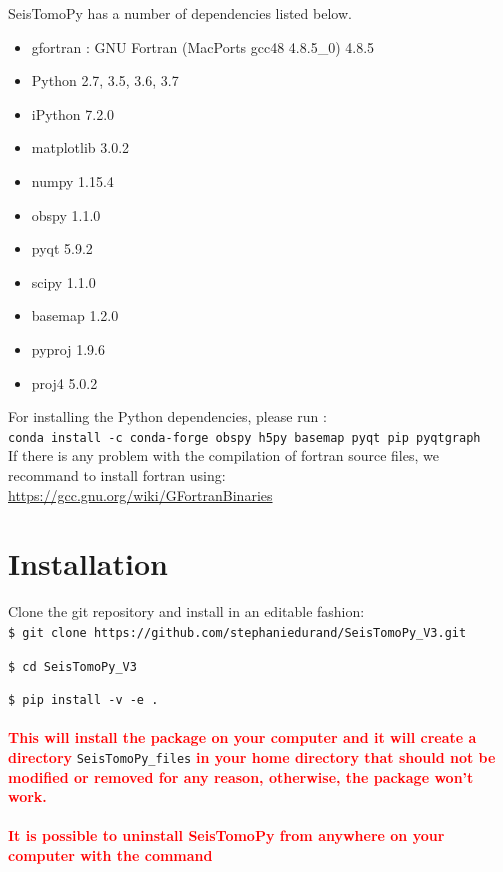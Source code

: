 \documentclass[12pt]{article}
\begin{document}
SeisTomoPy has a number of dependencies listed below.

\begin{itemize}
    \item gfortran : GNU Fortran (MacPorts gcc48 4.8.5\_0) 4.8.5
\item Python 2.7, 3.5, 3.6, 3.7
\item iPython 7.2.0
\item matplotlib 3.0.2
\item  numpy 1.15.4
\item obspy 1.1.0
\item pyqt 5.9.2
\item scipy 1.1.0
\item basemap 1.2.0
\item pyproj 1.9.6
\item proj4 5.0.2
\end{itemize}
For installing the Python dependencies, please run :\\
\verb?conda install -c conda-forge obspy h5py basemap pyqt pip pyqtgraph ?\\

\noindent If there is any problem with the compilation of fortran source files, we recommand to install fortran using:\\
\url{https://gcc.gnu.org/wiki/GFortranBinaries}

\section{Installation}

Clone the git repository and install in an editable fashion:\\

\verb?$ git clone https://github.com/stephaniedurand/SeisTomoPy_V3.git?

\verb?$ cd SeisTomoPy_V3?

\verb?$ pip install -v -e .?
\\
\\
\noindent   \textcolor{red}{\textbf{This will install the package on your computer and it will create a directory}} \verb?SeisTomoPy_files? \textcolor{red}{\textbf{in your home directory that should not be modified or removed for any reason, otherwise, the package won't work.}} \\
\\
  \textcolor{red}{\textbf{It is possible to uninstall SeisTomoPy from anywhere on your computer with the command}}
\end{document}
